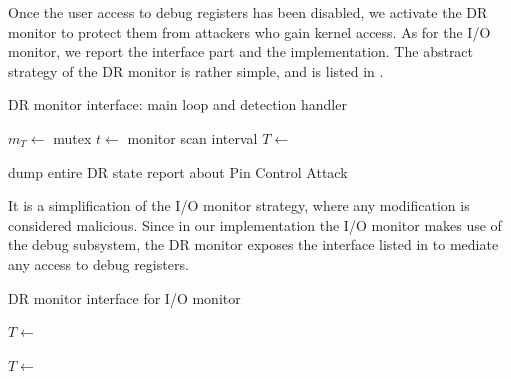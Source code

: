 Once the user access to debug registers has been disabled, we activate the DR monitor to protect them from attackers who gain kernel access.
As for the I/O monitor, we report the interface part and the implementation.
The abstract strategy of the DR monitor is rather simple, and is listed in .
\begin{algorithm}[h]
\caption{DR monitor interface: main loop and detection handler}
\label{alg:dr-iface}
\begin{algorithmic}[1]
	\State $m_T \gets$ mutex 
	\State $t \gets$ monitor scan interval 
	\State $T \gets$  
	\Loop
		\State {}
		\State {} 
		\State {}
			\State \Return {}
		\EndIf
		\State {} 
	\EndLoop
\EndFunction
\Statex
\end{algorithmic}

\begin{algorithmic}[1]
 
		\State dump entire DR state
	\EndIf
	\State report about Pin Control Attack
		\State {} 
	\EndIf
\EndFunction
\end{algorithmic}
\end{algorithm}
It is a simplification of the I/O monitor strategy, where any modification is considered malicious.
Since in our implementation the I/O monitor makes use of the debug subsystem, the DR monitor exposes the interface listed in 
to mediate any access to debug registers.
\begin{algorithm}[h]
\caption{DR monitor interface for I/O monitor}
\label{alg:dr-ioiface}
\begin{algorithmic}[1]
 
	\State {}
	\State {} 
	\State $T \gets$  
	\State {}
\EndFunction
\Statex
\end{algorithmic}

\begin{algorithmic}[1]
 
	\State {}
	\State {} 
	\State $T \gets$  
	\State {}
\EndFunction
\end{algorithmic}
\end{algorithm}
